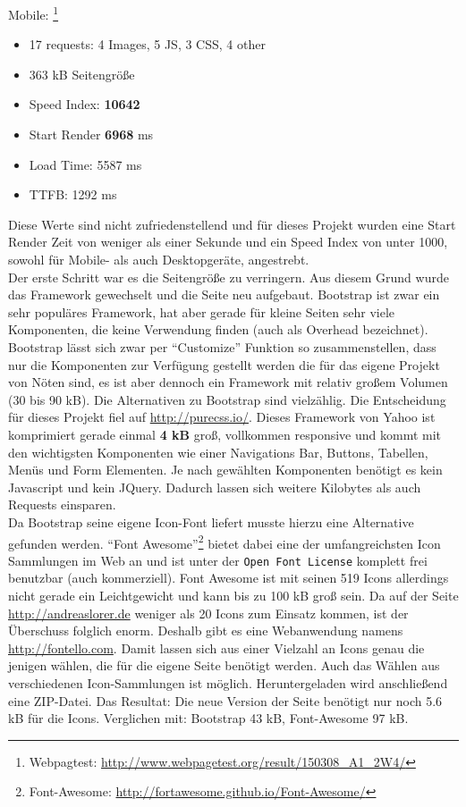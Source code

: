 		Mobile: \footnote{Webpagtest: \url{http://www.webpagetest.org/result/150308_A1_2W4/}}
		\begin{itemize}
			\item 17 requests: 4 Images, 5 JS, 3 CSS, 4 other
			\item 363 kB Seitengröße
			\item Speed Index: \textbf{10642}
			\item Start Render \textbf{6968} ms
			\item Load Time: 5587 ms
			\item TTFB: 1292 ms
		\end{itemize}

		Diese Werte sind nicht zufriedenstellend und für dieses Projekt wurden eine Start Render Zeit von weniger als einer Sekunde und ein Speed Index von unter 1000, sowohl für Mobile- als auch Desktopgeräte, angestrebt.\\

		Der erste Schritt war es die Seitengröße zu verringern. Aus diesem Grund wurde das Framework gewechselt und die Seite neu aufgebaut. Bootstrap ist zwar ein sehr populäres Framework, hat aber gerade für kleine Seiten sehr viele Komponenten, die keine Verwendung finden (auch als Overhead bezeichnet). Bootstrap lässt sich zwar per "`Customize"' Funktion so zusammenstellen, dass nur die Komponenten zur Verfügung gestellt werden die für das eigene Projekt von Nöten sind, es ist aber dennoch ein Framework mit relativ großem Volumen (30 bis 90 kB). Die Alternativen zu Bootstrap sind vielzählig. Die Entscheidung für dieses Projekt fiel auf \url{http://purecss.io/}. Dieses Framework von Yahoo ist komprimiert gerade einmal \textbf{4 kB} groß, vollkommen responsive und kommt mit den wichtigsten Komponenten wie einer Navigations Bar, Buttons, Tabellen, Menüs und Form Elementen. Je nach gewählten Komponenten benötigt es kein Javascript und kein JQuery. Dadurch lassen sich weitere Kilobytes als auch Requests einsparen.\\
		Da Bootstrap seine eigene Icon-Font liefert musste hierzu eine Alternative gefunden werden. "`Font Awesome"'\footnote{Font-Awesome: \url{http://fortawesome.github.io/Font-Awesome/}} bietet dabei eine der umfangreichsten Icon Sammlungen im Web an und ist unter der \texttt{Open Font License} komplett frei benutzbar (auch kommerziell). Font Awesome ist mit seinen 519 Icons allerdings nicht gerade ein Leichtgewicht und kann bis zu 100 kB groß sein. Da auf der Seite \url{http://andreaslorer.de} weniger als 20 Icons zum Einsatz kommen, ist der Überschuss folglich enorm. Deshalb gibt es eine Webanwendung namens \url{http://fontello.com}. Damit lassen sich aus einer Vielzahl an Icons genau die jenigen wählen, die für die eigene Seite benötigt werden. Auch das Wählen aus verschiedenen Icon-Sammlungen ist möglich. Heruntergeladen wird anschließend eine ZIP-Datei. Das Resultat: Die neue Version der Seite benötigt nur noch 5.6 kB für die Icons. Verglichen mit: Bootstrap 43 kB, Font-Awesome 97 kB.\\

